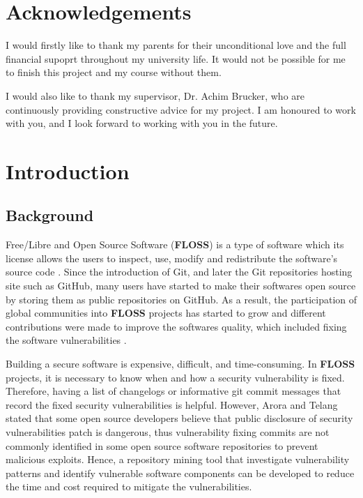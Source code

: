 \documentclass[12pt, a4paper]{report}
\begin{document}
\newpage


\chapter*{Acknowledgements}
I would firstly like to thank my parents for their unconditional love and the full financial supoprt
throughout my university life. It would not be possible for me to finish this project and my course
without them.

I would also like to thank my supervisor, Dr. Achim Brucker, who are continuously providing
constructive advice for my project. I am honoured to work with you, and I look forward to working
with you in the future.

\newpage

\tableofcontents


\listoftables {}

\newpage


\chapter{Introduction}
\section{Background}
Free/Libre and Open Source Software (\textbf{FLOSS}) is a type of software which its license allows
the users to inspect, use, modify and redistribute the software's source code \cite{crowston_2012}.
Since the introduction of Git, and later the Git repositories hosting site such as GitHub, many
users have started to make their softwares open source by storing them as public repositories on
GitHub. As a result, the participation of global communities into \textbf{FLOSS} projects has
started to grow and different contributions were made to improve the softwares quality, which
included fixing the software vulnerabilities \cite{dabbish_2012}.

Building a secure software is expensive, difficult, and time-consuming. In \textbf{FLOSS} projects,
it is necessary to know when and how a security vulnerability is fixed. Therefore, having a list of
changelogs or informative git commit messages that record the fixed security vulnerabilities is
helpful. However, Arora and Telang \cite{arora_2005} stated that some open source developers believe
that public disclosure of security vulnerabilities patch is dangerous, thus vulnerability fixing
commits are not commonly identified in some open source software repositories to prevent malicious
exploits. Hence, a repository mining tool that investigate vulnerability patterns and identify
vulnerable software components can be developed to reduce the time and cost required to mitigate the
vulnerabilities.
\end{document}
